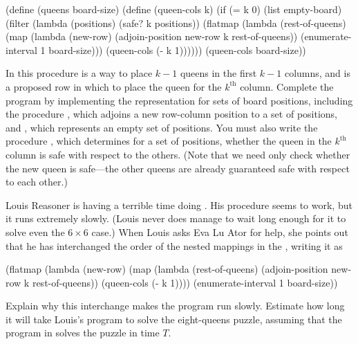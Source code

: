 \begin{exerciseGroup}
\begin{codeBlock}

(define (queens board-size)
  (define (queen-cols k)
    (if (= k 0)
        (list empty-board)
        (filter
         (lambda (positions) (safe? k positions))
         (flatmap
          (lambda (rest-of-queens)
            (map (lambda (new-row)
                   (adjoin-position
                    new-row k rest-of-queens))
                 (enumerate-interval 1 board-size)))
          (queen-cols (- k 1))))))
  (queen-cols board-size))
\end{codeBlock}

In this procedure  is a way to place \( k - 1 \) queens in
the first \( k - 1 \) columns, and  is a proposed row in which to
place the queen for the \( k^{\mathrm{th}} \) column.  Complete the program by implementing
the representation for sets of board positions, including the procedure
, which adjoins a new row-column position to a set of
positions, and , which represents an empty set of positions.
You must also write the procedure , which determines for a set of
positions, whether the queen in the \( k^{\mathrm{th}} \) column is safe with respect to the
others.  (Note that we need only check whether the new queen is safe---the
other queens are already guaranteed safe with respect to each other.)

\label{Exercise 2.43}
 Louis Reasoner is having a
terrible time doing .  His  procedure seems to
work, but it runs extremely slowly.  (Louis never does manage to wait long
enough for it to solve even the \( 6\times6 \) case.)  When Louis asks Eva Lu Ator for
help, she points out that he has interchanged the order of the nested mappings
in the , writing it as

\begin{codeBlock}
(flatmap
 (lambda (new-row)
   (map (lambda (rest-of-queens)
          (adjoin-position new-row k rest-of-queens))
        (queen-cols (- k 1))))
 (enumerate-interval 1 board-size))
\end{codeBlock}

Explain why this interchange makes the program run slowly.  Estimate how long
it will take Louis's program to solve the eight-queens puzzle, assuming that
the program in  solves the puzzle in time \( T \).
\end{exerciseGroup}

